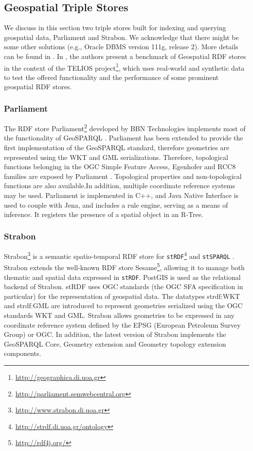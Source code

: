 \subsection{Geospatial Triple Stores}
\label{sec:geotps}
We discuss in this section two triple stores built for indexing and querying geospatial data, Parliament and Strabon. We acknowledge that there might be some other solutions (e.g., Oracle DBMS version 111g, release 2). More details can be found in \cite{koubarakis12, battle12, garbis13}. In \cite{garbis13}, the authors present a benchmark of Geospatial RDF stores in the context of the TELIOS project\footnote{\url{http://geographica.di.uoa.gr}}, which uses real-world and synthetic data to test the offered functionality and the performance of some prominent geospatial RDF stores.

\subsubsection{Parliament}
The RDF store Parliament\footnote{\url{http://parliament.semwebcentral.org}} developed by BBN Technologies implements most of the functionality of GeoSPARQL \cite{battle12}. Parliament has been extended to provide the first implementation of the GeoSPARQL standard, therefore geometries are represented using the WKT and GML serializations. Therefore, topological functions belonging in the OGC Simple Feature Access, Egenhofer and RCC8 families are exposed by Parliament \cite{battle12}. Topological properties and non-topological functions are also available.In addition, multiple coordinate reference systems may be used. Parliament is implemented in C++, and Java Native Interface is used to couple with Jena, and includes a rule engine, serving as a means of inference. It registers the presence of a spatial object in an R-Tree.

\subsubsection{Strabon}
Strabon\footnote{\url{http://www.strabon.di.uoa.gr}} is a semantic spatio-temporal RDF store for \texttt{stRDF}\footnote{\url{http://strdf.di.uoa.gr/ontology}} and \texttt{stSPARQL} \cite{strabon12}. Strabon extends the well-known RDF store Sesame\footnote{\url{http://rdf4j.org/}}, allowing it to manage both thematic and spatial data expressed in \texttt{stRDF}. PostGIS is used as the relational backend of Strabon. stRDF uses OGC standards (the OGC SFA specification in particular) for the representation of geospatial data. The datatypes strdf:WKT and strdf:GML are introduced to represent geometries serialized using the OGC standards WKT and GML. Strabon allows geometries to be expressed in any coordinate reference system defined by the EPSG (European Petroleum Survey Group) or OGC. In addition, the latest version of Strabon implements the GeoSPARQL Core, Geometry extension and Geometry topology extension components.

